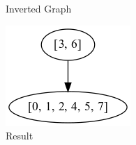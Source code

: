 \documentclass{article}
\begin{document}
\begin{figure}[!htb]
  \caption{Inverted Graph}
\endminipage\hfill
{}
  \includegraphics[width=\linewidth]{"./output/scc_example_result.png"}
  \caption{Result}
\endminipage
\end{figure}
\end{document}
